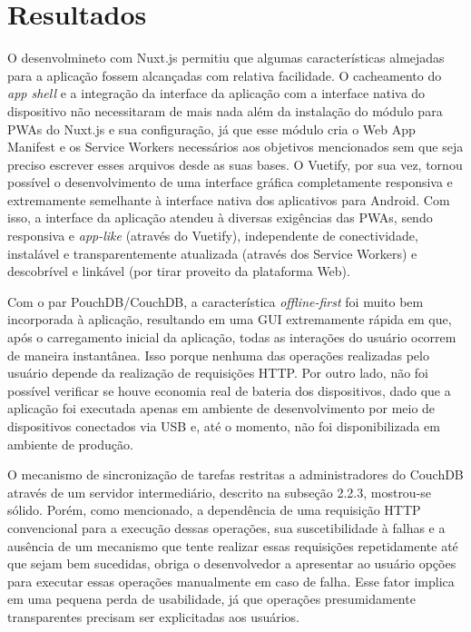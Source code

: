 \documentclass[
	article,			%
	12pt,				%
	oneside,			%
	a4paper,			%
	english,			%
	brazil,				%
	sumario=tradicional
	]{abntex2}
\begin{document}
% 

\section{Resultados}

O desenvolmineto com Nuxt.js permitiu que algumas características almejadas para a aplicação fossem alcançadas com relativa facilidade. O cacheamento do \textit{app shell} e a integração da interface da aplicação com a interface nativa do dispositivo não necessitaram de mais nada além da instalação do módulo para PWAs do Nuxt.js e sua configuração, já que esse módulo cria o Web App Manifest e os Service Workers necessários aos objetivos mencionados sem que seja preciso escrever esses arquivos desde as suas bases. O Vuetify, por sua vez, tornou possível o desenvolvimento de uma interface gráfica completamente responsiva e extremamente semelhante à interface nativa dos aplicativos para Android. Com isso, a interface da aplicação atendeu à diversas exigências das PWAs, sendo responsiva e \textit{app-like} (através do Vuetify), independente de conectividade, instalável e transparentemente atualizada (através dos Service Workers) e descobrível e linkável (por tirar proveito da plataforma Web).

Com o par PouchDB/CouchDB, a característica \textit{offline-first} foi muito bem incorporada à aplicação, resultando em uma GUI extremamente rápida em que, após o carregamento inicial da aplicação, todas as interações do usuário ocorrem de maneira instantânea. Isso porque nenhuma das operações realizadas pelo usuário depende da realização de requisições HTTP. Por outro lado, não foi possível verificar se houve economia real de bateria dos dispositivos, dado que a aplicação foi executada apenas em ambiente de desenvolvimento por meio de dispositivos conectados via USB e, até o momento, não foi disponibilizada em ambiente de produção.

O mecanismo de sincronização de tarefas restritas a administradores do CouchDB através de um servidor intermediário, descrito na subseção 2.2.3, mostrou-se sólido. Porém, como mencionado, a dependência de uma requisição HTTP convencional para a execução dessas operações, sua suscetibilidade à falhas e a ausência de um mecanismo que tente realizar essas requisições repetidamente até que sejam bem sucedidas, obriga o desenvolvedor a apresentar ao usuário opções para executar essas operações manualmente em caso de falha. Esse fator implica em uma pequena perda de usabilidade, já que operações presumidamente transparentes precisam ser explicitadas aos usuários.
\end{document}
